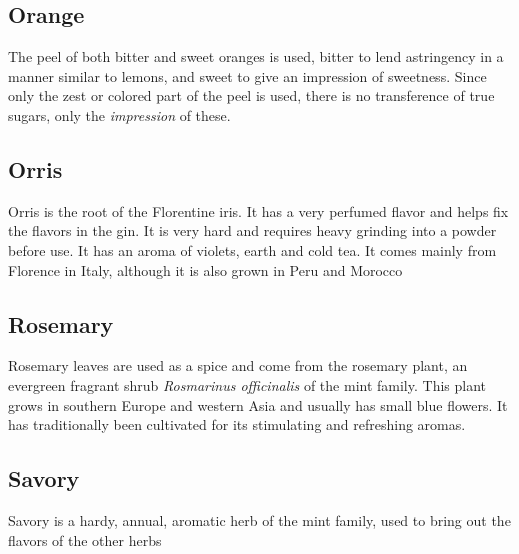 \subsection*{Orange} The peel of both bitter and sweet oranges is
used, bitter to lend astringency in a manner similar to lemons, and sweet to
give an impression of sweetness. Since only the zest or colored part of the
peel is used, there is no transference of true sugars, only the
\emph{impression} of these.

\subsection*{Orris} Orris is the root of the Florentine iris. It
has a very perfumed flavor and helps fix the flavors in the gin. It is very
hard and requires heavy grinding into a powder before use. It has an aroma of
violets, earth and cold tea. It comes mainly from Florence in Italy, although
it is also grown in Peru and Morocco

\subsection*{Rosemary} Rosemary leaves are used as a spice and
come from the rosemary plant, an evergreen fragrant shrub \emph{Rosmarinus
officinalis} of the mint family. This plant grows in southern Europe and
western Asia and usually has small blue flowers. It has traditionally been
cultivated for its stimulating and refreshing aromas.

\subsection*{Savory} Savory is a hardy, annual, aromatic herb of
the mint family, used to bring out the flavors of the other herbs


